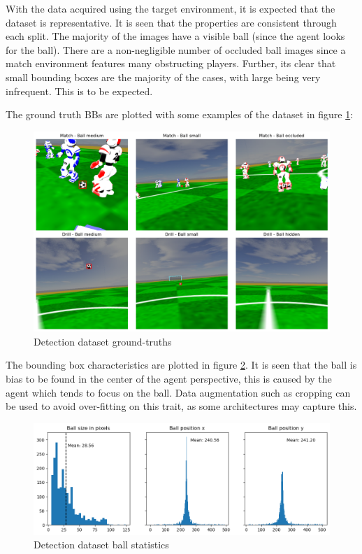 \documentclass[a4paper,twoside,12pt]{report}
\begin{document}
With the data acquired using the target environment, it is expected that the dataset is representative. It is seen that the properties are consistent through each split. The majority of the images have a visible ball (since the agent looks for the ball). There are a non-negligible number of occluded ball images since a match environment features many obstructing players. Further, its clear that small bounding boxes are the majority of the cases, with large being very infrequent. This is to be expected.

The ground truth BBs are plotted with some examples of the dataset in figure \ref{fig:detectimages}:

\begin{figure}[h!]
\begin{center}
\includegraphics[width=16cm]{images/imagedetections.png}
\caption{Detection dataset ground-truths}
\label{fig:detectimages}
\end{center}
\end{figure}

The bounding box characteristics are plotted in figure \ref{fig:detectplot}. It is seen that the ball is bias to be found in the center of the agent perspective, this is caused by the agent which tends to focus on the ball. Data augmentation such as cropping can be used to avoid over-fitting on this trait, as some architectures may capture this.

\begin{figure}[h!]
\begin{center}
\includegraphics[width=15cm]{images/plotdetections.png}
\caption{Detection dataset ball statistics}
\label{fig:detectplot}
\end{center}
\end{figure}
\end{document}
